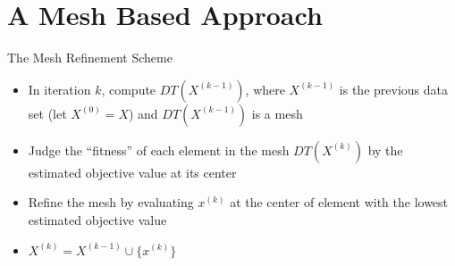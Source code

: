 \documentclass[xcolor=dvipsnames]{beamer}
\begin{document}
\section{A Mesh Based Approach}
\begin{frame}{The Mesh Refinement Scheme}
\begin{itemize}
\item In iteration $k$, compute $DT(X^{(k-1)})$, where $X^{(k-1)}$ is the
previous data set (let $X^{(0)} = X$) and $DT(X^{(k-1)})$ is a mesh\\
\pause
\item Judge the ``fitness'' of each element in the mesh
$DT(X^{(k)})$ by the estimated objective value at its center\\
\pause
\item Refine the mesh by evaluating $x^{(k)}$ at the center of element
with the lowest estimated objective value\\
\pause
\item $X^{(k)} = X^{(k-1)} \cup \{x^{(k)}\}$
\end{itemize}
\end{frame}
\end{document}
